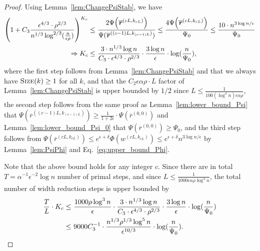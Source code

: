 \documentclass[11pt]{article}
\def\implies{\Rightarrow}
\let\originalleft\left
\let\originalright\right
\renewcommand{\left}{\mathopen{}\mathclose\bgroup\originalleft}
\renewcommand{\right}{\aftergroup\egroup\originalright}
\newcommand\rr{\boldsymbol{\mathit{r}}}
\newcommand\ww{\boldsymbol{\mathit{w}}}
\newcommand\rrbar{\overline{\boldsymbol{\mathit{r}}}}
\newcommand{\ov}{\overline}
\begin{document}
\begin{proof}
Using Lemma~\ref{lem:ChangePsiStab}, we have
\begin{align*}
\left( 1 + C_3 \frac{\epsilon^{4/3} \cdot \rho^{2/3}}{n^{1/3} \log^{2/3}(\frac{n}{\epsilon\rho})} \right)^{K_c} \leq &~ \frac{2 \Psi\left(\ov{\rr}^{(cL,k_{cL})}\right)}{\Psi(\ov{\rr}^{((c-1)L,k_{(c-1)L})})}  
\leq  \frac{4 \Psi\left(\ov{\rr}^{(cL,k_{cL})}\right)}{\Psi_0} 
\leq \frac{10 \cdot n^{3 \log n / \epsilon}}{\Psi_0} \\
\implies K_c \leq &~ \frac{3 \cdot n^{1/3} \log n}{C_3 \cdot \epsilon^{4/3} \cdot \rho^{2/3}} \cdot \frac{3 \log n}{\epsilon} \cdot \log(\frac{n}{\Psi_0}),
\end{align*}
where the first step follows from Lemma~\ref{lem:ChangePsiStab} and that we always have $\textsc{Size}(k) \geq 1$ for all $k$, and that the $C_2 \epsilon \alpha \rho \cdot L$ factor of Lemma~\ref{lem:ChangePsiStab} is upper bounded by $1/2$ since $L \leq \frac{1}{100 (\log^4 n) \epsilon \alpha \rho}$, the second step follows from the same proof as Lemma~\ref{lem:lower_bound_Psi} that $\Psi(\ov{\rr}^{((c-1)L,k_{(c-1)L})})\geq \frac{1}{1+2\epsilon}\cdot\Psi(\ov{\rr}^{(0,0)})$ and Lemma~\ref{lem:lower_bound_Psi_0} that $\Psi(\ov{\rr}^{(0,0)}) \geq \Psi_0$, and the third step follows from $\Psi(\rrbar^{(cL,k_{cL})}) \leq e^{\epsilon + \delta} \Phi(\ww^{(cL,k_{cL})}) \leq e^{\epsilon + \delta} n^{3 \log n / \epsilon}$ by Lemma~\ref{lem:PsiPhi} and Eq.~\eqref{eq:upper_bound_Phi}. 


Note that the above bound holds for any integer $c$. Since there are in total $T = \alpha^{-1}\epsilon^{-2}\log n $ number of primal steps, and since $L \leq \frac{1}{1000 \epsilon \alpha \rho \log^4 n}$, the total number of width reduction steps is upper bounded by
\begin{align*}
\frac{T}{L} \cdot K_c \leq &~ \frac{1000 \rho \log^3 n}{\epsilon} \cdot \frac{3 \cdot n^{1/3} \log n}{C_3 \cdot \epsilon^{4/3} \cdot \rho^{2/3}} \cdot \frac{3 \log n}{\epsilon} \cdot \log(\frac{n}{\Psi_0}) \\
\leq &~ 9000 C_3^{-1} \cdot \frac{n^{1/3} \rho^{1/3} \log^5 n}{\epsilon^{10/3}} \cdot \log(\frac{n}{\Psi_0}). \qedhere
\end{align*}
\end{proof}
\end{document}
